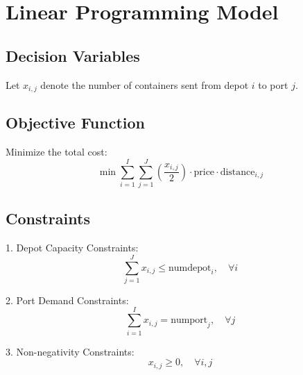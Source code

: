 \documentclass{article}
\begin{document}
\section*{Linear Programming Model}

\subsection*{Decision Variables}
Let \( x_{i,j} \) denote the number of containers sent from depot \( i \) to port \( j \).

\subsection*{Objective Function}
Minimize the total cost:
\[
\min \sum_{i=1}^{I} \sum_{j=1}^{J} \left(\frac{x_{i,j}}{2}\right) \cdot \text{price} \cdot \text{distance}_{i,j}
\]

\subsection*{Constraints}
1. Depot Capacity Constraints:
   \[
   \sum_{j=1}^{J} x_{i,j} \leq \text{numdepot}_{i}, \quad \forall i
   \]

2. Port Demand Constraints:
   \[
   \sum_{i=1}^{I} x_{i,j} = \text{numport}_{j}, \quad \forall j
   \]

3. Non-negativity Constraints:
   \[
   x_{i,j} \geq 0, \quad \forall i, j
   \]
\end{document}
